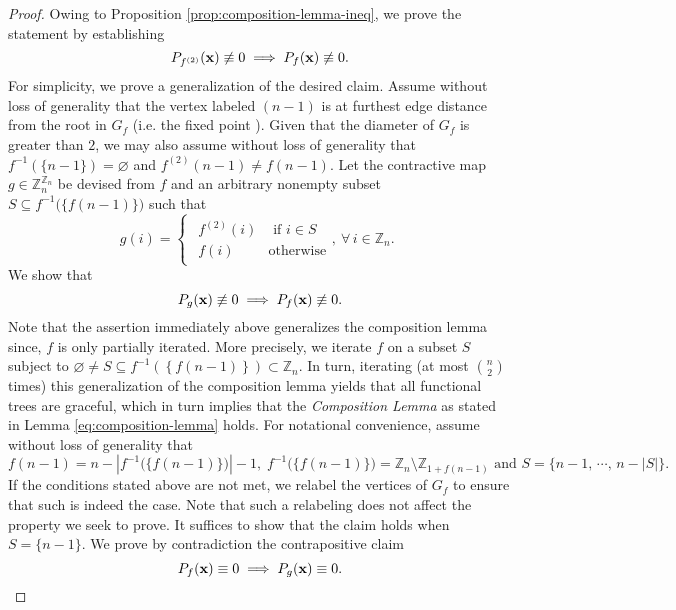 \begin{proof}
Owing to Proposition \ref{prop:composition-lemma-ineq}, we prove the statement by establishing 
\[
    P_{f^{(2)}} ({\bf x}) \not\equiv 0  \implies  P_{f} ({\bf x}) \not\equiv 0.
\]
For simplicity, we prove a generalization of the desired claim. Assume without loss of generality that the vertex labeled $(n-1)$ is at furthest edge distance from the root in $G_f$ (i.e. the fixed point ). Given that the diameter of $G_{f}$ is greater than $2$, we may also assume without loss of generality that  $f^{-1}\left(\{n-1\}\right)=\varnothing$
and $f^{(2)}(n-1)\ne f(n-1)$. Let the contractive
map $g\in\mathbb{Z}_{n}^{\mathbb{Z}_{n}}$ be devised from $f$ and an arbitrary nonempty subset $S\subseteq f^{-1}\big(\{f(n-1)\}\big)$ such
that 
\begin{equation}
g(i)=\begin{cases}
\begin{array}{cc}
f^{(2)}(i) & \text{ if }i\in S\\
f(i) & \text{otherwise}
\end{array},\ \forall\,i\in\mathbb{Z}_{n}.\end{cases}
\end{equation}
We show that
\begin{equation} \label{eq:composition-lemma-generalized}
P_{g} ({\bf x}) \not\equiv 0  \implies  P_{f} ({\bf x}) \not\equiv 0.
\end{equation}
Note that the assertion immediately above generalizes the composition
lemma since, $f$ is only partially
iterated. More precisely, we iterate $f$ on a subset $S$ subject to
$\varnothing\ne S\subseteq f^{-1}\left(\left\{ f(n-1)\right\} \right)\subset\mathbb{Z}_{n}$.
In turn, iterating (at most ${n \choose 2}$ times) this generalization  of the composition lemma yields
that all functional trees are graceful, which in turn implies that the \textit{Composition Lemma} as stated in Lemma \ref{eq:composition-lemma}  holds. For notational convenience, assume without loss of generality that 
\begin{equation}
f(n-1)=n-\left|f^{-1}\big(\{f(n-1)\}\big)\right|-1,\; f^{-1}\big(\{f(n-1)\}\big)=\mathbb{Z}_{n}\setminus\mathbb{Z}_{1+f(n-1)} \text{ and } S=\big\{ n-1,\,\cdots,\,n-|S|\big\}.
\end{equation}
If the conditions stated above are not met, we relabel the vertices of $G_f$ to ensure that such is indeed the case. Note that such a relabeling does not affect the property we seek to prove. It suffices to show that the claim holds when $S=\{n-1\}$. We prove by contradiction the contrapositive claim
\begin{equation}\label{eq:contrapositive}
    P_{f}({\bf x})\equiv0\implies P_{g}({\bf x})\equiv0.
\end{equation}


\end{proof}
